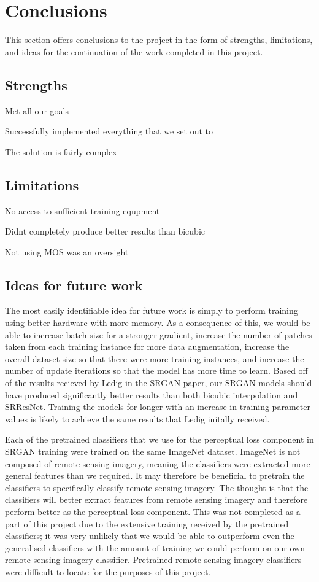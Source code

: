 \section{Conclusions}
This section offers conclusions to the project in the form of strengths, limitations, and ideas for the continuation of the work completed in this project.

\subsection{Strengths}
Met all our goals

Successfully implemented everything that we set out to

The solution is fairly complex

\subsection{Limitations}
No access to sufficient training equpment

Didnt completely produce better results than bicubic

Not using MOS was an oversight

\subsection{Ideas for future work}
The most easily identifiable idea for future work is simply to perform training using better hardware with more memory. As a consequence of this, we would be able to increase batch size for a stronger gradient, increase the number of patches taken from each training instance for more data augmentation, increase the overall dataset size so that there were more training instances, and increase the number of update iterations so that the model has more time to learn. Based off of the results recieved by Ledig \etal in the SRGAN paper, our SRGAN models should have produced significantly better results than both bicubic interpolation and SRResNet. Training the models for longer with an increase in training parameter values is likely to achieve the same results that Ledig \etal initally received.  

Each of the pretrained classifiers that we use for the perceptual loss component in SRGAN training were trained on the same ImageNet dataset. ImageNet is not composed of remote sensing imagery, meaning the classifiers were extracted more general features than we required. It may therefore be beneficial to pretrain the classifiers to specifically classify remote sensing imagery. The thought is that the classifiers will better extract features from remote sensing imagery and therefore perform better as the perceptual loss component. This was not completed as a part of this project due to the extensive training received by the pretrained classifiers; it was very unlikely that we would be able to outperform even the generalised classifiers with the amount of training we could perform on our own remote sensing imagery classifier. Pretrained remote sensing imagery classifiers were difficult to locate for the purposes of this project.

